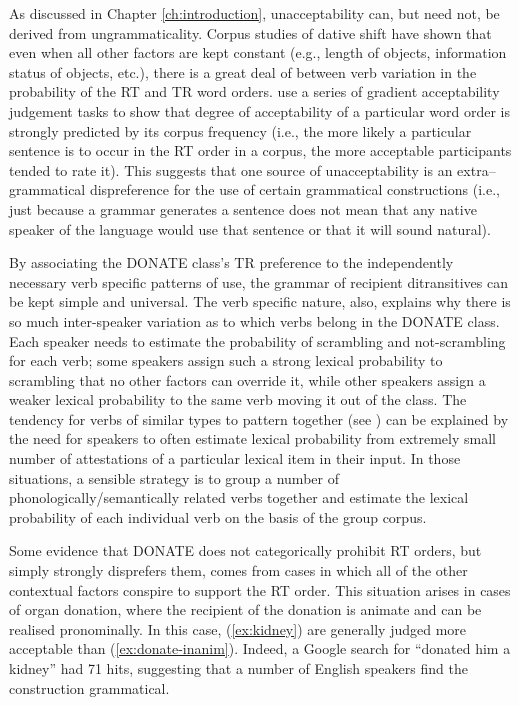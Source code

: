 As discussed in Chapter \ref{ch:introduction}, unacceptability can, but need not, be derived from ungrammaticality. Corpus studies of dative shift \citep{Collins.1995,Bresnan.2007,Bresnan.2009} have shown that even when all other factors are kept constant (e.g., length of objects, information status of objects, etc.), there is a great deal of between verb variation in the probability of the RT and TR word orders. \cite{Bresnan.2010} use a series of gradient acceptability judgement tasks to show that degree of acceptability of a particular word order is strongly predicted by its corpus frequency (i.e., the more likely a particular sentence is to occur in the RT order in a corpus, the more acceptable participants tended to rate it). This suggests that one source of unacceptability is an extra--grammatical dispreference for the use of certain grammatical constructions (i.e., just because a grammar generates a sentence does not mean that any native speaker of the language would use that sentence or that it will sound natural). 

By associating the DONATE class's TR preference to the independently necessary verb specific patterns of use, the grammar of recipient ditransitives can be kept simple and universal. The verb specific nature, also, explains why there is so much inter-speaker variation as to which verbs belong in the DONATE class. Each speaker needs to estimate the probability of scrambling and not-scrambling for each verb; some speakers assign such a strong lexical probability to scrambling that no other factors can override it, while other speakers assign a weaker lexical probability to the same verb moving it out of the class. The tendency for verbs of similar types to pattern together (see \citealt{Levin.1993}) can be explained by the need for speakers to often estimate lexical probability from extremely small number of attestations of a particular lexical item in their input. In those situations, a sensible strategy is to group a number of phonologically/semantically related verbs together and estimate the lexical probability of each individual verb on the basis of the group corpus.

Some evidence that DONATE does not categorically prohibit RT orders, but simply strongly disprefers them, comes from cases in which all of the other contextual factors conspire to support the RT order. This situation arises in cases of organ donation, where the recipient of the donation is animate and can be realised pronominally. In this case, (\ref{ex:kidney}) are generally judged more acceptable than (\ref{ex:donate-inanim}). Indeed, a Google search for ``donated him a kidney'' had 71 hits, suggesting that a number of English speakers find the construction grammatical.

